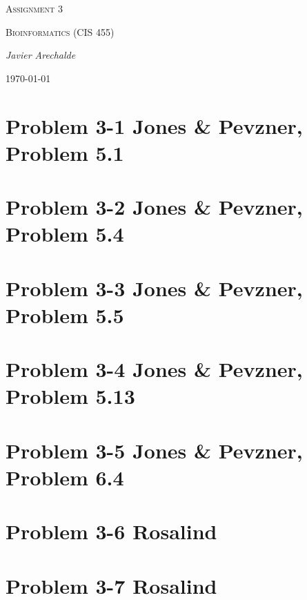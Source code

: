 \documentclass{article}
\begin{document}
\begin{titlepage}
	\centering
	{\scshape\LARGE Assignment 3\par}
	\vspace{1cm}
	{\scshape\Large Bioinformatics (CIS 455)\par}
	\vspace{1.5cm}
	{\Large\itshape Javier Arechalde\par}
	\vfill
	{\large \today\par}
\end{titlepage}

\section*{Problem 3-1 Jones \& Pevzner, Problem 5.1}

\section*{Problem 3-2 Jones \& Pevzner, Problem 5.4}

\section*{Problem 3-3 Jones \& Pevzner, Problem 5.5}

\section*{Problem 3-4 Jones \& Pevzner, Problem 5.13}

\section*{Problem 3-5 Jones \& Pevzner, Problem 6.4}

\section*{Problem 3-6 Rosalind}

\section*{Problem 3-7 Rosalind}
\end{document}
